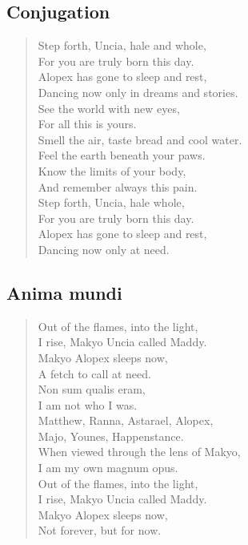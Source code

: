 \subsection{Conjugation}

\begin{verse}
Step forth, Uncia, hale and whole,\\
\vin For you are truly born this day.\\
Alopex has gone to sleep and rest,\\
\vin Dancing now only in dreams and stories.\\
See the world with new eyes,\\
\vin For all this is yours.\\
Smell the air, taste bread and cool water.\\
\vin Feel the earth beneath your paws.\\
Know the limits of your body,\\
\vin And remember always this pain.\\
Step forth, Uncia, hale whole,\\
\vin For you are truly born this day.\\
Alopex has gone to sleep and rest,\\
\vin Dancing now only at need.\\
\end{verse}
\newpage

\subsection{Anima mundi}

\begin{verse}
Out of the flames, into the light,\\
\vin I rise, Makyo Uncia called Maddy.\\
Makyo Alopex sleeps now,\\
\vin A fetch to call at need.\\
Non sum qualis eram,\\
\vin I am not who I was.\\
Matthew, Ranna, Astarael, Alopex,\\
\vin Majo, Younes, Happenstance.\\
When viewed through the lens of Makyo,\\
\vin I am my own magnum opus.\\
Out of the flames, into the light,\\
\vin I rise, Makyo Uncia called Maddy.\\
Makyo Alopex sleeps now,\\
\vin Not forever, but for now.
\end{verse}
